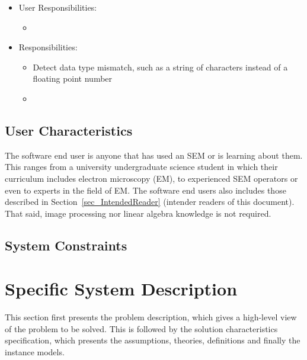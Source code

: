 \documentclass[12pt]{article}
\begin{document}
\begin{itemize}
\item User Responsibilities:
\begin{itemize}
\item 
\end{itemize}
\item \progname{} Responsibilities:
\begin{itemize}
\item Detect data type mismatch, such as a string of characters instead of a
  floating point number
\item 
\end{itemize}
\end{itemize}

\subsection{User Characteristics} \label{SecUserCharacteristics}

The \progname{} software end user is anyone that has used an SEM or is learning about them. This ranges from a university undergraduate science student in which their curriculum includes electron microscopy (EM), to experienced SEM operators or even to experts in the field of EM. The software end users also includes those described in Section~\ref{sec_IntendedReader} (intender readers of this document). That said, image processing nor linear algebra knowledge is not required. 

\subsection{System Constraints}


\section{Specific System Description}

This section first presents the problem description, which gives a high-level
view of the problem to be solved.  This is followed by the solution characteristics
specification, which presents the assumptions, theories, definitions and finally
the instance models.
\end{document}
